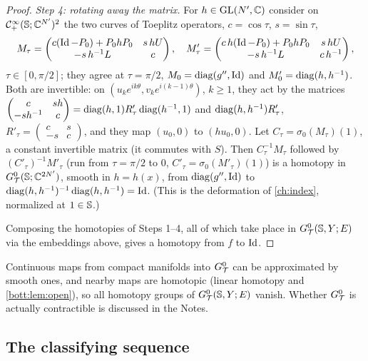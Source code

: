 \begin{proof}
  \emph{Step 4: rotating away the matrix.} For $h\in\operatorname{GL}(N',\mathbb{C})$ consider on
  $\mathcal{C}^\infty_+(\mathbb{S};\mathbb{C}^{N'})^{2}$ the two curves of Toeplitz operators, $c=\cos\tau$, $s=\sin\tau$,
  \begin{equation*}
    M_\tau=\begin{pmatrix}c(\operatorname{Id}-P_0)+P_0hP_0&s\,hU\\-s\,h^{-1}L&c\end{pmatrix},\quad
    M'_\tau=\begin{pmatrix}c\,h(\operatorname{Id}-P_0)+P_0hP_0&s\,hU\\-s\,h^{-1}L&c\,h^{-1}\end{pmatrix},
  \end{equation*}
  $\tau\in[0,\pi/2]$; they agree at $\tau=\pi/2$, $M_0=\operatorname{diag}(g'',\operatorname{Id})$ and $M'_0=\operatorname{diag}(h,h^{-1})$.
  Both are invertible: on $(u_ke^{ik\theta},v_ke^{i(k-1)\theta})$, $k\ge1$, they act by the
  matrices $\begin{pmatrix}c&sh\\-sh^{-1}&c\end{pmatrix}=\operatorname{diag}(h,1)R'_\tau\operatorname{diag}(h^{-1},1)$ and
  $\operatorname{diag}(h,h^{-1})R'_\tau$, $R'_\tau=\begin{pmatrix}c&s\\-s&c\end{pmatrix}$, and they map
  $(u_0,0)$ to $(hu_0,0)$. Let $C_\tau=\sigma_0(M_\tau)(1)$, a constant invertible matrix (it
  commutes with $S$). Then $C_\tau^{-1}M_\tau$ followed by $(C'_\tau)^{-1}M'_\tau$ (run from
  $\tau=\pi/2$ to $0$, $C'_\tau=\sigma_0(M'_\tau)(1)$) is a homotopy in $G^{0}_{\mathcal{T}}(\mathbb{S};\mathbb{C}^{2N'})$,
  smooth in $h=h(x)$, from $\operatorname{diag}(g'',\operatorname{Id})$ to $\operatorname{diag}(h,h^{-1})^{-1}\operatorname{diag}(h,h^{-1})=\operatorname{Id}$.
  (This is the deformation of \cref{ch:index}, normalized at $1\in\mathbb{S}$.)

  Composing the homotopies of Steps 1--4, all of which take place in $G^{0}_{\mathcal{T}}(\mathbb{S},Y;E)$ via
  the embeddings above, gives a homotopy from $f$ to $\operatorname{Id}$.
\end{proof}

\begin{remark}
  Continuous maps from compact manifolds into $G^{0}_{\mathcal{T}}$ can be approximated by smooth ones,
  and nearby maps are homotopic (linear homotopy and \cref{bott:lem:open}), so all homotopy
  groups of $G^{0}_{\mathcal{T}}(\mathbb{S},Y;E)$ vanish. Whether $G^{0}_{\mathcal{T}}$ is actually contractible is discussed in
  the Notes.
\end{remark}

\subsection{The classifying sequence}


